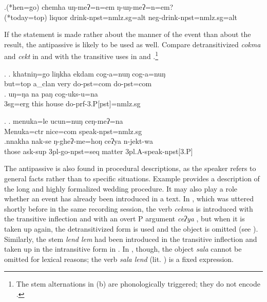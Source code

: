 	\exg.\label{ex-raksi}(*hen=go) chemha uŋ-meʔ=n=em ŋ-uŋ-meʔ=n=em? \\
(*today{\sc =top}) liquor  drink{\sc [3sg]-npst=nmlz.sg=alt} {\sc neg-}drink{\sc [3sg]-npst=nmlz.sg=alt}\\

If the statement is made rather about the manner of the event than about the result, the antipassive is likely to be used as well. Compare detransitivized \emph{cokma}  and \emph{cekt}  in \Next[a] and  \NNext[a] with the transitive uses in  \Next[b] and \NNext[b].\footnote{The stem alternations in (b) are phonologically triggered; they do not encode .}

\ex. \ag. khatniŋ=go liŋkha ekdam cog-a=nuŋ cog-a=nuŋ\\
but{\sc =top} a\_clan  very do{\sc [3sg]-pst=com} do{\sc [3sg]-pst=com}\\
 
\bg. uŋ=ŋa na paŋ cog-uks-u=na\\
   {\sc 3sg=erg} this house   do{\sc -prf-3.P[pst]=nmlz.sg}\\

\ex. \ag. menuka=le ucun=nuŋ ceŋ-meʔ=na\\
Menuka{\sc =ctr} nice{\sc =com} speak{\sc [3sg]-npst=nmlz.sg}\\
\bg.nnakha nak-se            ŋ-gheʔ-me=hoŋ          ceʔya n-jekt-wa\\
		those ask{\sc -sup} {\sc 3pl-}go{\sc -npst=seq}	matter	{\sc 3pl.A-}speak{\sc -npst[3.P]}\\
	 


The antipassive is also found in procedural descriptions, as the speaker refers to general facts rather than to specific situations. Example \Next[a] provides  a description of the long and highly formalized wedding procedure. It may also play a role whether an event has  already been introduced in a text. In \Last[b], which was uttered shortly before \Next[a] in the same recording session, the verb \emph{cekma}  is introduced with the transitive inflection and with an overt P argument \emph{ceʔya} , but when it is taken up again, the detransitivized form is used and the object is omitted (see \Next[a]). Similarly, the stem \emph{lend \ti lem}  had been introduced in the transitive inflection and taken up in the intransitive form in  \Next[a]. In \Next[b], though, the object  \emph{sala} cannot be omitted for lexical reasons; the verb \emph{sala lend}  (lit. ) is a  fixed expression.

